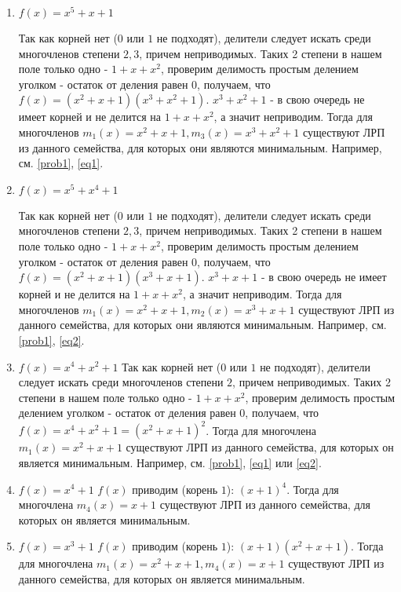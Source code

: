 \documentclass[utf8x, 14pt]{G7-32} %
\begin{document}
\begin{enumerate}
    \item $f(x) = x^5+x+1$
    
     Так как корней нет ($0$ или $1$ не подходят), делители следует искать среди многочленов степени $2,3$, причем неприводимых. Таких 2 степени в нашем поле только одно - $1 + x + x^2$, проверим делимость простым делением уголком - остаток от деления равен $0$, получаем, что $f(x) = (x^2+x+1)(x^3+x^2+1)$. $x^3+x^2+1$ - в свою очередь не имеет корней и не делится на $1 + x + x^2$, а значит неприводим. Тогда для многочленов $m_1(x)=x^2+x+1, m_3(x) = x^3+x^2+1$ существуют ЛРП из данного семейства, для которых они  являются минимальным. Например, см. \ref{prob1}, \ref{eq1}.
     
     \item $f(x) = x^5+x^4+1$
     
     Так как корней нет ($0$ или $1$ не подходят), делители следует искать среди многочленов степени $2,3$, причем неприводимых. Таких 2 степени в нашем поле только одно - $1 + x + x^2$, проверим делимость простым делением уголком - остаток от деления равен $0$, получаем, что $f(x) = (x^2+x+1)(x^3+x+1)$. $x^3+x+1$ - в свою очередь не имеет корней и не делится на $1 + x + x^2$, а значит неприводим. Тогда для многочленов $m_1(x)=x^2+x+1, m_2(x)=x^3+x+1$ существуют ЛРП из данного семейства, для которых они  являются минимальным.  Например, см. \ref{prob1}, \ref{eq2}.
     
     \item $f(x) = x^4+x^2+1$
     Так как корней нет ($0$ или $1$ не подходят), делители следует искать среди многочленов степени $2$, причем неприводимых. Таких 2 степени в нашем поле только одно - $1 + x + x^2$, проверим делимость простым делением уголком - остаток от деления равен $0$, получаем, что $f(x) = x^4+x^2+1 = (x^2+x+1)^2$. Тогда для многочлена $m_1(x)=x^2+x+1$ существуют ЛРП из данного семейства, для которых он  является минимальным.  Например, см. \ref{prob1}, \ref{eq1} или \ref{eq2}.
     
     \item $f(x) = x^4+1$
     $f(x)$ приводим (корень $1$): $(x+1)^4$. Тогда для многочлена $m_4(x)=x+1$ существуют ЛРП из данного семейства, для которых он является минимальным. 
    
     \item $f(x) = x^3+1$
     $f(x)$ приводим (корень $1$): $(x+1)(x^2+x+1)$. Тогда для многочлена $m_1(x)=x^2+x+1, m_4(x)=x+1$ существуют ЛРП из данного семейства, для которых он  является минимальным. 
     
\end{enumerate}
\end{document}
